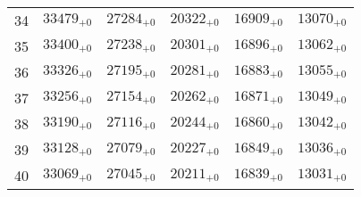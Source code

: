 \documentclass[10pt, a4paper]{article}
\begin{document}
\begin{center}
\begin{longtable}{c || c c c c c}
        34 & \({33479}_{+0}\) & \({27284}_{+0}\) & \({20322}_{+0}\) & \({16909}_{+0}\) & \({13070}_{+0}\)\\
        35 & \({33400}_{+0}\) & \({27238}_{+0}\) & \({20301}_{+0}\) & \({16896}_{+0}\) & \({13062}_{+0}\)\\
        \hline
        36 & \({33326}_{+0}\) & \({27195}_{+0}\) & \({20281}_{+0}\) & \({16883}_{+0}\) & \({13055}_{+0}\)\\
        37 & \({33256}_{+0}\) & \({27154}_{+0}\) & \({20262}_{+0}\) & \({16871}_{+0}\) & \({13049}_{+0}\)\\
        38 & \({33190}_{+0}\) & \({27116}_{+0}\) & \({20244}_{+0}\) & \({16860}_{+0}\) & \({13042}_{+0}\)\\
        39 & \({33128}_{+0}\) & \({27079}_{+0}\) & \({20227}_{+0}\) & \({16849}_{+0}\) & \({13036}_{+0}\)\\
        40 & \({33069}_{+0}\) & \({27045}_{+0}\) & \({20211}_{+0}\) & \({16839}_{+0}\) & \({13031}_{+0}\)\\
        \hline
    \end{longtable}
\end{center}
\pagebreak
\end{document}
